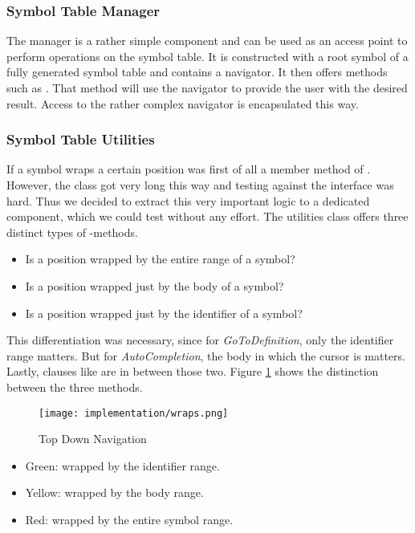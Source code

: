 \subsubsection{Symbol Table Manager}
The manager is a rather simple component and can be used as an access point to perform operations on the symbol table.
It is constructed with a root symbol of a fully generated symbol table and contains a navigator.
It then offers methods such as .
That method will use the navigator to provide the user with the desired result.
Access to the rather complex navigator is encapsulated this way.

\subsubsection{Symbol Table Utilities}
If a symbol wraps a certain position was first of all a member method of .
However, the class  got very long this way and testing against the interface was hard.
Thus we decided to extract this very important logic to a dedicated component, which we could test without any effort.
The utilities class offers three distinct types of -methods.
\begin{itemize}
    \item Is a position wrapped by the entire range of a symbol?
    \item Is a position wrapped just by the body of a symbol?
    \item Is a position wrapped just by the identifier of a symbol?
\end{itemize}
This differentiation was necessary, since for \textit{GoToDefinition}, only the identifier range matters.
But for \textit{AutoCompletion}, the body in which the cursor is matters.
Lastly, clauses like  are in between those two.
Figure \ref{fig:topDownWraps} shows the distinction between the three methods.

\begin{figure}[H]
    \centering
    \texttt{[image: implementation/wraps.png]}
    \caption{Top Down Navigation}
    \label{fig:topDownWraps}
\end{figure}

\begin{itemize}
    \item Green: wrapped by the identifier range.
    \item Yellow: wrapped by the body range.
    \item Red: wrapped by the entire symbol range.
\end{itemize}

